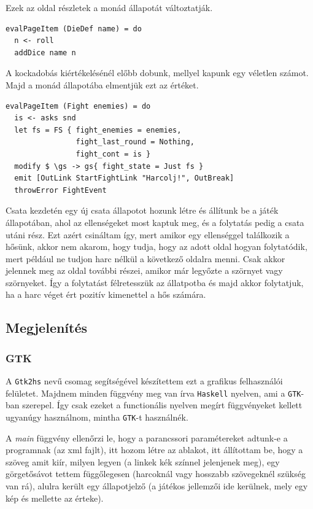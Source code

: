 \documentclass[12pt,a4paper,oneside]{report}
\newcommand{\proglang}{\texttt}
\begin{document}
  Ezek az oldal részletek a monád állapotát változtatják.
  \begin{verbatim}
evalPageItem (DieDef name) = do
  n <- roll
  addDice name n
  \end{verbatim}
  A kockadobás kiértékelésénél előbb dobunk, mellyel kapunk egy
  véletlen számot. Majd a monád állapotába elmentjük ezt az értéket.
  \begin{verbatim}
evalPageItem (Fight enemies) = do
  is <- asks snd
  let fs = FS { fight_enemies = enemies,
                fight_last_round = Nothing,
                fight_cont = is }
  modify $ \gs -> gs{ fight_state = Just fs }
  emit [OutLink StartFightLink "Harcolj!", OutBreak]
  throwError FightEvent
  \end{verbatim}
  Csata kezdetén egy új csata állapotot hozunk létre és állítunk be a
  játék állapotában, ahol az ellenségeket most kaptuk meg, és a
  folytatás pedig a csata utáni rész. Ezt azért csináltam így, mert
  amikor egy ellenséggel találkozik a hősünk, akkor nem akarom,
  hogy tudja, hogy az adott oldal hogyan folytatódik, mert például ne
  tudjon harc nélkül a következő oldalra menni. Csak akkor jelennek
  meg az oldal további részei, amikor már legyőzte a szörnyet vagy
  szörnyeket. Így a folytatást félretesszük az állatpotba és majd
  akkor folytatjuk, ha a harc véget ért pozitív kimenettel a hős számára.
  
  \subsection{Megjelenítés}

    \subsubsection{GTK}
      A \proglang{Gtk2hs} nevű csomag segítségével készítettem ezt a grafikus
      felhasználói felületet. Majdnem minden függvény meg van írva
      \proglang{Haskell} nyelven, ami a \proglang{GTK}-ban szerepel. Így csak ezeket a
      functionális nyelven megírt függvényeket kellett ugyanúgy
      használnom, mintha \proglang{GTK}-t használnék.

      A \emph{main} függvény ellenőrzi le, hogy a parancssori paramétereket
      adtunk-e a programnak (az xml fajlt), itt hozom létre az
      ablakot, itt állítottam be, hogy a szöveg amit kiír, milyen
      legyen (a linkek kék színnel jelenjenek meg), egy görgetősávot
      tettem függőlegesen (harcoknál vagy hosszabb szövegeknél szükség
      van rá), alulra került egy állapotjelző (a játékos jellemzői ide
      kerülnek, mely egy kép és mellette az érteke).
\end{document}
